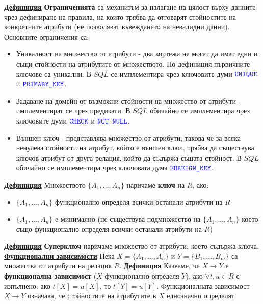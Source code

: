 \documentclass{article}
\newcommand{\sqlkw}[1]{\textcolor{blue}{\texttt{#1}}}
\begin{document}
\textbf{\underline{Дефиниция}}
\textbf{Ограниченията} са механизъм за налагане на цялост върху данните чрез дефиниране на правила, на които трябва да отговарят стойностите на конкретните
атрибути (не позволяват въвеждането на невалидни данни).
Основните ограничения са:
\begin{itemize}
    \item Уникалност на множество от атрибути - два кортежа не могат да имат едни и същи стойности на атрибутите от множеството. По дефиниция
    първичните ключове са уникални. В $SQL$ се имплементира чрез ключовите думи $\sqlkw{UNIQUE}$ и $\sqlkw{PRIMARY\_KEY}$.
    \item Задаване на домейн от възможни стойности на множество от атрибути - имплементират се чрез предикати. В $SQL$ обичайно се имплементира
    чрез ключовите думи $\sqlkw{CHECK}$ и $\sqlkw{NOT NULL}$.
    \item Външен ключ - представлява множество от атрибути, такова че за всяка ненулева стойности на атрибут, който е външен ключ, трябва да
    съществува ключов атрибут от друга релация, който да съдържа същата стойност. В $SQL$ обичайно се имплементира чрез ключовата дума
    $\sqlkw{FOREIGN\_KEY}$.
\end{itemize}
\textbf{\underline{Дефиниция}}
Множеството $\{A_1, ..., A_n\}$ наричаме \textbf{ключ} на $R$, ако:
\begin{itemize}
    \item $\{A_1, ..., A_n\}$ функционално определя всички останали атрибути на $R$
    \item $\{A_1, ..., A_n\}$ е минимално (не съществува подмножество на $\{A_1, ..., A_n\}$ което също функционално определя всички останали атрибути на $R$)
\end{itemize}
\textbf{\underline{Дефиниция}}
\textbf{Суперключ} наричаме множество от атрибути, което съдържа ключа. \newline\newline
\textbf{\underline{Функционални зависимости}} \newline\newline
Нека $X = \{A_1, ..., A_n\}$ и $Y = \{B_1, ..., B_m\}$ са множества от атрибути на релация $R$. \newline\newline
\textbf{\underline{Дефиниция}}
Казваме, че $X \rightarrow Y$ е \textbf{функционална зависимост} ($X$ функционално определя $Y$), ако $\forall t, u \in R$ е изпълнено:
ако $t[X] = u[X]$, то $t[Y] = u[Y]$. Функционалната зависимост $X \rightarrow Y$ означава, че стойностите на атрибутите в $X$ еднозначно определят
\end{document}
